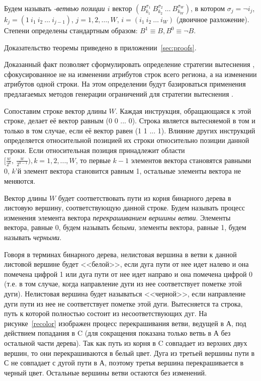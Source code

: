 Будем называть \emph{\PseudoLRU-ветвью позиции $i$} вектор
$(B_{k_1}^{\sigma_1}~B_{k_2}^{\sigma_2}~\dots~B_{k_W}^{\sigma_W})$,
в котором $\sigma_j = \neg i_j$, $k_j = (1~i_1~i_2~\dots~i_{j-1})$,
$j = 1, 2, \dots, W$, $i = (i_1~i_2~\dots~i_W)$ (двоичное
разложение). Степени определены стандартным образом: $B^1 \equiv B,
B^0 \equiv \neg B$.

\begin{theorem}\label{thm_pseudoLRU_invariant} \PseudoLRUInvariant
\end{theorem}
Доказательство теоремы приведено в приложении~\ref{sec:proofs}.

Доказанный факт позволяет сформулировать определение стратегии
вытеснения \PseudoLRU, сфокусированное не на изменении атрибутов строк всего
региона,
а на изменении атрибутов одной строки. На этом определении
будут базироваться применения предлагаемых методов генерации
ограничений для стратегии вытеснения \PseudoLRU.

\begin{utv}
Сопоставим строке вектор длины $W$. Каждая инструкция, обращающаяся к этой
строке,
делает её вектор равным (0 0 ... 0). Строка является вытесняемой в
том и только в том случае, если её вектор равен (1 1 ... 1).
Влияние других инструкций определяется относительной позицией их
строки относительно позиции данной строки. Если относительная позиция
принадлежит области $[\frac{w}{2^k},~\frac{w}{2^{k-1}}), k =
1,2,...,W$, то первые $k{-}1$ элементов вектора становятся равными
0, $k$'й элемент вектора становится равным 1, остальные элементы
вектора не меняются.
\end{utv}

Вектор длины $W$ будет соответствовать пути из корня бинарного
дерева в листовую вершину, соответствующую данной строке.
Будем называть процесс изменения элемента вектора
\emph{перекрашиванием вершины ветви}. Элементы вектора, равные 0,
будем называть \emph{белыми}, элементы вектора, равные 1, будем
называть \emph{черными}.

Говоря в терминах бинарного дерева, нелистовая вершина в ветви к
данной листовой вершине будет <<белой>>, если дуга пути от нее идет
налево и она помечена цифрой 1 или дуга пути от нее идет направо и она
помечена цифрой 0 (т.е. в том случае, когда направление дуги из нее
соответствует пометке этой дуги). Нелистовая вершина будет
называться <<черной>>, если направление дуги пути из нее не соответствует
пометке этой дуги. Вытесняется та строка, путь к которой
полностью состоит из несоответствующих дуг. На рисунке~\ref{recolor}
изображен процесс перекрашивания ветви, ведущей в А, под действием
попадания в C (для сокращения показана только ветвь в А без
остальной части дерева). Так как путь из корня в C совпадает из
верхних двух вершин, то они перекрашиваются в белый цвет. Дуга из
третьей вершины пути в С не совпадает с дугой пути в А, поэтому
третья вершина перекрашивается в черный цвет. Остальные вершины
ветви остаются без изменений.


